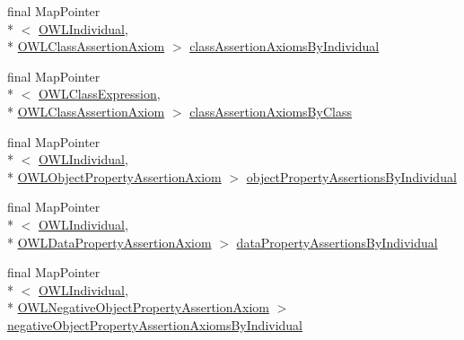 \begin{DoxyCompactItemize}
\item 
final Map\-Pointer\\*
$<$ \hyperlink{interfaceorg_1_1semanticweb_1_1owlapi_1_1model_1_1_o_w_l_individual}{O\-W\-L\-Individual}, \\*
\hyperlink{interfaceorg_1_1semanticweb_1_1owlapi_1_1model_1_1_o_w_l_class_assertion_axiom}{O\-W\-L\-Class\-Assertion\-Axiom} $>$ \hyperlink{classuk_1_1ac_1_1manchester_1_1cs_1_1owl_1_1owlapi_1_1_abstract_internals_impl_abbee76467173e02cb5d8bd078594ae63}{class\-Assertion\-Axioms\-By\-Individual}
\item 
final Map\-Pointer\\*
$<$ \hyperlink{interfaceorg_1_1semanticweb_1_1owlapi_1_1model_1_1_o_w_l_class_expression}{O\-W\-L\-Class\-Expression}, \\*
\hyperlink{interfaceorg_1_1semanticweb_1_1owlapi_1_1model_1_1_o_w_l_class_assertion_axiom}{O\-W\-L\-Class\-Assertion\-Axiom} $>$ \hyperlink{classuk_1_1ac_1_1manchester_1_1cs_1_1owl_1_1owlapi_1_1_abstract_internals_impl_a9af61f8573306403d4ccdd242b257c30}{class\-Assertion\-Axioms\-By\-Class}
\item 
final Map\-Pointer\\*
$<$ \hyperlink{interfaceorg_1_1semanticweb_1_1owlapi_1_1model_1_1_o_w_l_individual}{O\-W\-L\-Individual}, \\*
\hyperlink{interfaceorg_1_1semanticweb_1_1owlapi_1_1model_1_1_o_w_l_object_property_assertion_axiom}{O\-W\-L\-Object\-Property\-Assertion\-Axiom} $>$ \hyperlink{classuk_1_1ac_1_1manchester_1_1cs_1_1owl_1_1owlapi_1_1_abstract_internals_impl_a024db6e8abd1ec6db0038e0e3b149f16}{object\-Property\-Assertions\-By\-Individual}
\item 
final Map\-Pointer\\*
$<$ \hyperlink{interfaceorg_1_1semanticweb_1_1owlapi_1_1model_1_1_o_w_l_individual}{O\-W\-L\-Individual}, \\*
\hyperlink{interfaceorg_1_1semanticweb_1_1owlapi_1_1model_1_1_o_w_l_data_property_assertion_axiom}{O\-W\-L\-Data\-Property\-Assertion\-Axiom} $>$ \hyperlink{classuk_1_1ac_1_1manchester_1_1cs_1_1owl_1_1owlapi_1_1_abstract_internals_impl_ae6097451cad862937d68f27596f0c124}{data\-Property\-Assertions\-By\-Individual}
\item 
final Map\-Pointer\\*
$<$ \hyperlink{interfaceorg_1_1semanticweb_1_1owlapi_1_1model_1_1_o_w_l_individual}{O\-W\-L\-Individual}, \\*
\hyperlink{interfaceorg_1_1semanticweb_1_1owlapi_1_1model_1_1_o_w_l_negative_object_property_assertion_axiom}{O\-W\-L\-Negative\-Object\-Property\-Assertion\-Axiom} $>$ \hyperlink{classuk_1_1ac_1_1manchester_1_1cs_1_1owl_1_1owlapi_1_1_abstract_internals_impl_a8e11058c7fa14e1371d28544f8257f00}{negative\-Object\-Property\-Assertion\-Axioms\-By\-Individual}

\end{DoxyCompactItemize}
